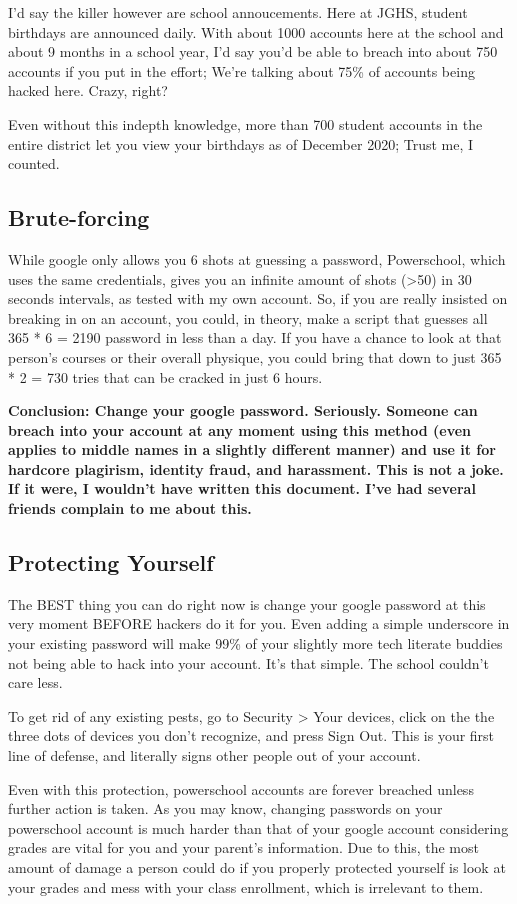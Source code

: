 I'd say the killer however are school annoucements. Here at JGHS, student birthdays are announced daily. With about 1000 accounts here at the school and about 9 months in a school year, I'd say you'd be able to breach into about 750 accounts if you put in the effort; We're talking about 75\% of accounts being hacked here. Crazy, right?

Even without this indepth knowledge, more than 700 student accounts in the entire district let you view your birthdays as of December 2020; Trust me, I counted.

\subsection{Brute-forcing}

While google only allows you 6 shots at guessing a password, Powerschool, which uses the same credentials, gives you an infinite amount of shots (>50) in 30 seconds intervals, as tested with my own account. So, if you are really insisted on breaking in on an account, you could, in theory, make a script that guesses all 365 * 6 = 2190 password in less than a day. If you have a chance to look at that person's courses or their overall physique, you could bring that down to just 365 * 2 = 730 tries that can be cracked in just 6 hours.

\textbf{Conclusion: Change your google password. Seriously. Someone can breach into your account at any moment using this method (even applies to middle names in a slightly different manner) and use it for hardcore plagirism, identity fraud, and harassment. This is not a joke. If it were, I wouldn't have written this document. I've had several friends complain to me about this.}

\subsection{Protecting Yourself}

The BEST thing you can do right now is change your google password at this very moment BEFORE hackers do it for you. Even adding a simple underscore in your existing password will make 99\% of your slightly more tech literate buddies not being able to hack into your account. It's that simple. The school couldn't care less.

To get rid of any existing pests, go to Security > Your devices, click on the the three dots of devices you don't recognize, and press Sign Out. This is your first line of defense, and literally signs other people out of your account.

Even with this protection, powerschool accounts are forever breached unless further action is taken. As you may know, changing passwords on your powerschool account is much harder than that of your google account considering grades are vital for you and your parent's information. Due to this, the most amount of damage a person could do if you properly protected yourself is look at your grades and mess with your class enrollment, which is irrelevant to them.
